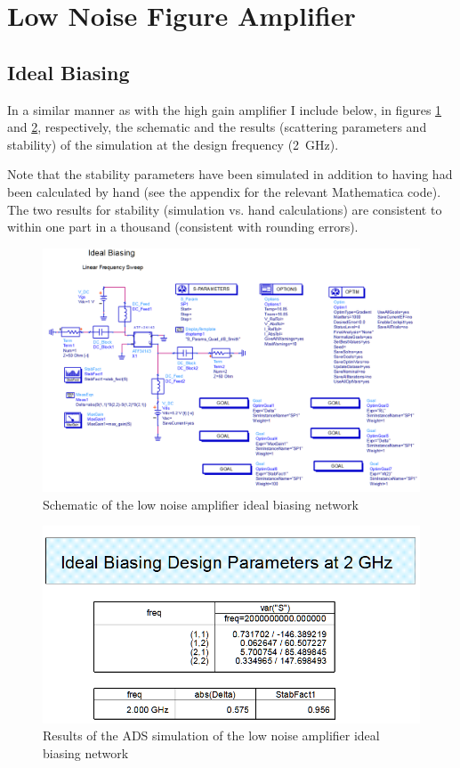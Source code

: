 \section{Low Noise Figure Amplifier}

\subsection{Ideal Biasing}

In a similar manner as with the high gain amplifier I include below, in figures
\ref{fig:A2P2IdealSchematic} and \ref{fig:A2P2IdealBiasingResults},
respectively, the schematic and the results (scattering parameters and
stability) of the simulation at the design frequency (\SI{2}{\giga\hertz}).

Note that the stability parameters have been simulated in addition to having had
been calculated by hand (see the appendix for the relevant Mathematica code).
The two results for stability (simulation vs. hand calculations) are consistent
to within one part in a thousand (consistent with rounding errors).

\begin{figure}[H]
    \centering
    \includegraphics[width=0.8\linewidth]{Images/A2P2IdealSchematic.png}
    \caption{Schematic of the low noise amplifier ideal biasing network}
    \label{fig:A2P2IdealSchematic}
\end{figure}

\begin{figure}[H]
    \centering
    \includegraphics[width=0.8\linewidth]{Images/A2P2IdealBiasingResults.png}
    \caption{Results of the ADS simulation of the low noise amplifier ideal biasing network}
    \label{fig:A2P2IdealBiasingResults}
\end{figure}

